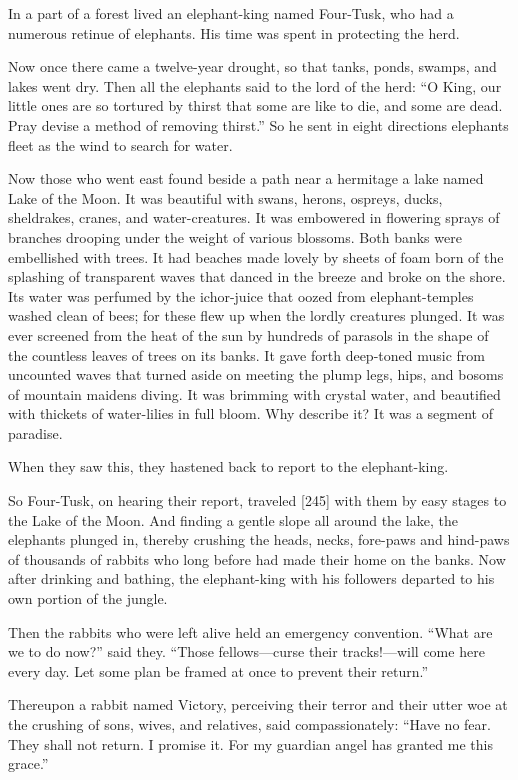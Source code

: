 \documentclass{article}
\begin{document}
In a part of a forest lived an elephant-king named Four-Tusk, who
had a numerous retinue of elephants. His time was spent in
protecting the herd.

Now once there came a twelve-year drought, so that tanks, ponds,
swamps, and lakes went dry. Then all the elephants said to the lord
of the herd:
``O King, our little ones are so tortured by thirst that some are like to die, and some are dead. Pray devise a method of removing thirst.''
So he sent in eight directions elephants fleet as the wind to
search for water.

Now those who went east found beside a path near a hermitage a lake
named Lake of the Moon. It was beautiful with swans, herons,
ospreys, ducks, sheldrakes, cranes, and water-creatures. It was
embowered in flowering sprays of branches drooping under the weight
of various blossoms. Both banks were embellished with trees. It had
beaches made lovely by sheets of foam born of the splashing of
transparent waves that danced in the breeze and broke on the shore.
Its water was perfumed by the ichor-juice that oozed from
elephant-temples washed clean of bees; for these flew up when the
lordly creatures plunged. It was ever screened from the heat of the
sun by hundreds of parasols in the shape of the countless leaves of
trees on its banks. It gave forth deep-toned music from uncounted
waves that turned aside on meeting the plump legs, hips, and bosoms
of mountain maidens diving. It was brimming with crystal water, and
beautified with thickets of water-lilies in full bloom. Why
describe it? It was a segment of paradise.

When they saw this, they hastened back to report to the
elephant-king.

So Four-Tusk, on hearing their report, traveled [245] with them by
easy stages to the Lake of the Moon. And finding a gentle slope all
around the lake, the elephants plunged in, thereby crushing the
heads, necks, fore-paws and hind-paws of thousands of rabbits who
long before had made their home on the banks. Now after drinking
and bathing, the elephant-king with his followers departed to his
own portion of the jungle.

Then the rabbits who were left alive held an emergency convention.
``What are we to do now?'' said they.
``Those fellows---curse their tracks!---will come here every day. Let some plan be framed at once to prevent their return.''

Thereupon a rabbit named Victory, perceiving their terror and their
utter woe at the crushing of sons, wives, and relatives, said
compassionately:
``Have no fear. They shall not return. I promise it. For my guardian angel has granted me this grace.''
\end{document}
